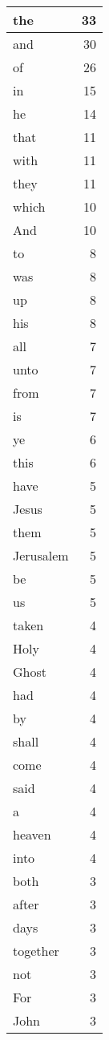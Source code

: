 \begin{center}
\begin{longtable}{l|r}
\hline \hline
\endlastfoot
the & 33 \\ \hline
and & 30 \\ \hline
of & 26 \\ \hline
in & 15 \\ \hline
he & 14 \\ \hline
that & 11 \\ \hline
with & 11 \\ \hline
they & 11 \\ \hline
which & 10 \\ \hline
And & 10 \\ \hline
to & 8 \\ \hline
was & 8 \\ \hline
up & 8 \\ \hline
his & 8 \\ \hline
all & 7 \\ \hline
unto & 7 \\ \hline
from & 7 \\ \hline
is & 7 \\ \hline
ye & 6 \\ \hline
this & 6 \\ \hline
have & 5 \\ \hline
Jesus & 5 \\ \hline
them & 5 \\ \hline
Jerusalem & 5 \\ \hline
be & 5 \\ \hline
us & 5 \\ \hline
taken & 4 \\ \hline
Holy & 4 \\ \hline
Ghost & 4 \\ \hline
had & 4 \\ \hline
by & 4 \\ \hline
shall & 4 \\ \hline
come & 4 \\ \hline
said & 4 \\ \hline
a & 4 \\ \hline
heaven & 4 \\ \hline
into & 4 \\ \hline
both & 3 \\ \hline
after & 3 \\ \hline
days & 3 \\ \hline
together & 3 \\ \hline
not & 3 \\ \hline
For & 3 \\ \hline
John & 3 \\ \hline

\end{longtable}
\end{center}
